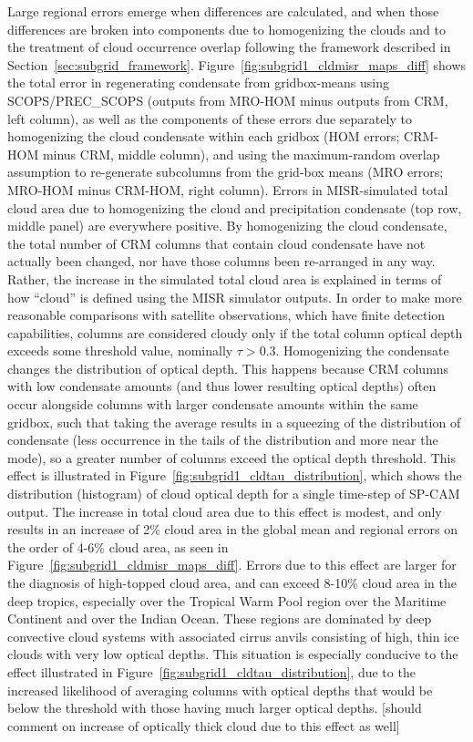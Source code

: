 Large regional errors emerge when differences are calculated, and when
those differences are broken into components due to homogenizing the
clouds and to the treatment of cloud occurrence overlap following the
framework described in Section~\ref{sec:subgrid_framework}.
Figure~\ref{fig:subgrid1_cldmisr_maps_diff} shows the total error in
regenerating condensate from gridbox-means using SCOPS/PREC\_SCOPS
(outputs from MRO-HOM minus outputs from CRM, left column), as well as
the components of these errors due separately to homogenizing the cloud
condensate within each gridbox (HOM errors; CRM-HOM minus CRM, middle
column), and using the maximum-random overlap assumption to re-generate
subcolumns from the grid-box means (MRO errors; MRO-HOM minus CRM-HOM,
right column). Errors in MISR-simulated total cloud area due to
homogenizing the cloud and precipitation condensate (top row, middle
panel) are everywhere positive. By homogenizing the cloud condensate,
the total number of CRM columns that contain cloud condensate have not
actually been changed, nor have those columns been re-arranged in any
way. Rather, the increase in the simulated total cloud area is explained
in terms of how ``cloud'' is defined using the MISR simulator outputs.
In order to make more reasonable comparisons with satellite
observations, which have finite detection capabilities, columns are
considered cloudy only if the total column optical depth exceeds some
threshold value, nominally \(\tau > 0.3\). Homogenizing the condensate
changes the distribution of optical depth. This happens because CRM
columns with low condensate amounts (and thus lower resulting optical
depths) often occur alongside columns with larger condensate amounts
within the same gridbox, such that taking the average results in a
squeezing of the distribution of condensate (less occurrence in the
tails of the distribution and more near the mode), so a greater number
of columns exceed the optical depth threshold. This effect is
illustrated in Figure~\ref{fig:subgrid1_cldtau_distribution}, which
shows the distribution (histogram) of cloud optical depth for a single
time-step of SP-CAM output. The increase in total cloud area due to this
effect is modest, and only results in an increase of 2\% cloud area in
the global mean and regional errors on the order of 4-6\% cloud area, as
seen in Figure~\ref{fig:subgrid1_cldmisr_maps_diff}. Errors due to this
effect are larger for the diagnosis of high-topped cloud area, and can
exceed 8-10\% cloud area in the deep tropics, especially over the
Tropical Warm Pool region over the Maritime Continent and over the
Indian Ocean. These regions are dominated by deep convective cloud
systems with associated cirrus anvils consisting of high, thin ice
clouds with very low optical depths. This situation is especially
conducive to the effect illustrated in
Figure~\ref{fig:subgrid1_cldtau_distribution}, due to the increased
likelihood of averaging columns with optical depths that would be below
the threshold with those having much larger optical depths. {[}should
comment on increase of optically thick cloud due to this effect as
well{]}

